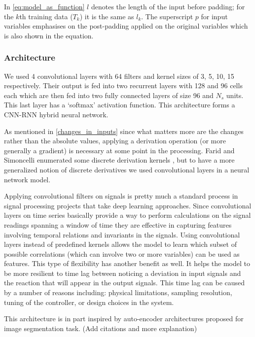 In \eqref{eq:model_as_function} $l$ denotes the length of the input before padding; for the $k$th training data ($T_k$) it is the same as $l_k$. The superscript $p$ for input variables emphasises on the post-padding applied on the original variables which is also shown in the equation.

\subsubsection{Architecture}
We used 4 convolutional layers with 64 filters and kernel sizes of 3, 5, 10, 15 respectively.
Their output is fed into two recurrent layers with 128 and 96 cells each which are then fed into two fully connected layers of size 96 and $N_s$ units. This last layer has a `softmax' activation function.
This architecture forms a CNN-RNN hybrid neural network. \cite{Wang2017}

As mentioned in \ref{changes_in_inputs} since what matters more are the changes rather than the absolute values, applying a derivation operation (or more generally a gradient) is necessary at some point in the processing. 
Farid and Simoncelli enumerated some discrete derivation kernels \cite{Farid2004}, but to have a more generalized notion of discrete derivatives we used convolutional layers in a neural network model. 

Applying convolutional filters on signals is pretty much a standard process in signal processing projects that take deep learning approaches.  \cite{morales2016deep, zeng2014convolutional, yang2015deep} Since convolutional layers on time series basically provide a way to perform calculations on the signal readings spanning a window of time they are effective in capturing features involving temporal relations and invariants in the signals. \cite{wang2017time} 
Using convolutional layers instead of predefined kernels allows the model to learn which subset of possible correlations (which can involve two or more variables) can be used as features. This type of flexibility has another benefit as well. It helps the model to be more resilient to time lag between noticing a deviation in input signals and the reaction that will appear in the output signals. This time lag can be caused by a number of reasons including: physical limitations, sampling resolution, tuning of the controller, or design choices in the system.

This architecture is in part inspired by auto-encoder architectures proposed for image segmentation task. (Add citations and more explanation)